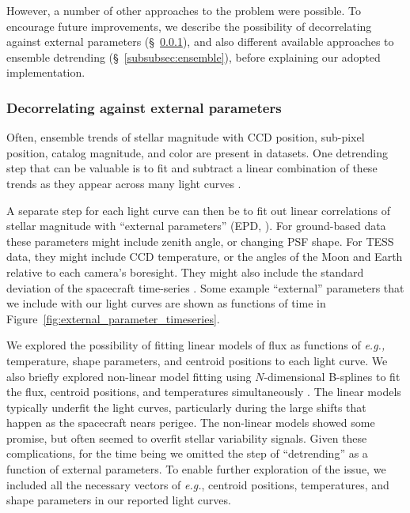 \documentclass[12pt,twocolumn,tighten,trackchanges]{aastex62}
\begin{document}
However, a number of other approaches to the problem were possible. To
encourage future improvements, we describe the possibility of
decorrelating against external parameters
(\S~\ref{subsubsec:external}), and also different available approaches
to ensemble detrending (\S~\ref{subsubsec:ensemble}), before
explaining our adopted implementation.


\subsubsection{Decorrelating against external parameters}
\label{subsubsec:external}

Often, ensemble trends of stellar magnitude with CCD position,
sub-pixel position, catalog magnitude, and color are present in
datasets.  One detrending step that can be valuable is to fit and
subtract a linear combination of these trends as they appear across
many light curves \citep[{\it e.g.},][\S~5.5]{zhang_precision_2016}.

A separate step for each light curve can then be to fit out linear
correlations of stellar magnitude with ``external parameters'' (EPD,
\citealt[][]{bakos_2010,huang_high-precision_2015}).  For ground-based
data these parameters might include zenith angle, or changing PSF
shape.  For TESS data, they might include CCD temperature, or the
angles of the Moon and Earth relative to each camera's boresight.
They might also include the standard deviation of the spacecraft
 time-series
\citep{vanderburg_hr858_2019}.  Some example ``external'' parameters
that we include with our light curves are shown as functions of time
in Figure~\ref{fig:external_parameter_timeseries}.

We explored the possibility of fitting linear models of flux as
functions of {\it e.g.,} temperature, shape parameters, and centroid
positions to each light curve.  We also briefly explored non-linear
model fitting using $N$-dimensional B-splines to fit the flux,
centroid positions, and temperatures simultaneously
\citep{dierckx_curve_1996}.  The linear models typically underfit the
light curves, particularly during the large shifts that happen as the
spacecraft nears perigee.  The non-linear models showed some promise,
but often seemed to overfit stellar variability signals.  Given these
complications, for the time being we omitted the step of
``detrending'' as a function of external parameters. To enable further
exploration of the issue, we included all the necessary vectors of
{\it e.g.}, centroid positions, temperatures, and shape parameters in
our reported light curves.
\end{document}
